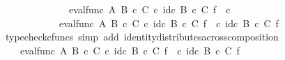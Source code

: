 \begin{isabellebody}
\ \ \ \ \isamarkupfalse%
\ {\isacharminus}{\kern0pt}\isanewline
\ \ \ \ \ \ \isamarkupfalse%
\ {\isachardoublequoteopen}eval{\isacharunderscore}{\kern0pt}func\ A\ {\isacharparenleft}{\kern0pt}B\ {\isasymtimes}\isactrlsub c\ C{\isacharparenright}{\kern0pt}\ {\isasymcirc}\isactrlsub c\ {\isacharparenleft}{\kern0pt}id\isactrlsub c\ {\isacharparenleft}{\kern0pt}B\ {\isasymtimes}\isactrlsub c\ C{\isacharparenright}{\kern0pt}\ {\isasymtimes}\isactrlsub f\ {\isacharparenleft}{\kern0pt}{\isasympsi}\isactrlsup {\isasymsharp}\ {\isasymcirc}\isactrlsub c\ {\isasymphi}\isactrlsup {\isasymsharp}\isactrlsup {\isasymsharp}{\isacharparenright}{\kern0pt}{\isacharparenright}{\kern0pt}\ {\isacharequal}{\kern0pt}\isanewline
\ \ \ \ \ \ \ \ \ \ \ \ eval{\isacharunderscore}{\kern0pt}func\ A\ {\isacharparenleft}{\kern0pt}B\ {\isasymtimes}\isactrlsub c\ C{\isacharparenright}{\kern0pt}\ {\isasymcirc}\isactrlsub c\ {\isacharparenleft}{\kern0pt}{\isacharparenleft}{\kern0pt}id\isactrlsub c\ {\isacharparenleft}{\kern0pt}B\ {\isasymtimes}\isactrlsub c\ C{\isacharparenright}{\kern0pt}\ {\isasymtimes}\isactrlsub f\ {\isacharparenleft}{\kern0pt}{\isasympsi}\isactrlsup {\isasymsharp}{\isacharparenright}{\kern0pt}{\isacharparenright}{\kern0pt}\ {\isasymcirc}\isactrlsub c\ {\isacharparenleft}{\kern0pt}id\isactrlsub c\ {\isacharparenleft}{\kern0pt}B\ {\isasymtimes}\isactrlsub c\ C{\isacharparenright}{\kern0pt}\ {\isasymtimes}\isactrlsub f\ {\isasymphi}\isactrlsup {\isasymsharp}\isactrlsup {\isasymsharp}{\isacharparenright}{\kern0pt}{\isacharparenright}{\kern0pt}{\isachardoublequoteclose}\isanewline
\ \ \ \ \ \ \ \ \isamarkupfalse%
\ {\isacharparenleft}{\kern0pt}typecheck{\isacharunderscore}{\kern0pt}cfuncs{\isacharcomma}{\kern0pt}\ simp\ add{\isacharcolon}{\kern0pt}\ identity{\isacharunderscore}{\kern0pt}distributes{\isacharunderscore}{\kern0pt}across{\isacharunderscore}{\kern0pt}composition{\isacharparenright}{\kern0pt}\isanewline
\ \ \ \ \ \ \isamarkupfalse%
\ \isamarkupfalse%
\ {\isachardoublequoteopen}{\isachardot}{\kern0pt}{\isachardot}{\kern0pt}{\isachardot}{\kern0pt}\ {\isacharequal}{\kern0pt}\ {\isacharparenleft}{\kern0pt}\ eval{\isacharunderscore}{\kern0pt}func\ A\ {\isacharparenleft}{\kern0pt}B\ {\isasymtimes}\isactrlsub c\ C{\isacharparenright}{\kern0pt}\ {\isasymcirc}\isactrlsub c\ {\isacharparenleft}{\kern0pt}id\isactrlsub c\ {\isacharparenleft}{\kern0pt}B\ {\isasymtimes}\isactrlsub c\ C{\isacharparenright}{\kern0pt}\ {\isasymtimes}\isactrlsub f\ {\isacharparenleft}{\kern0pt}{\isasympsi}\isactrlsup {\isasymsharp}{\isacharparenright}{\kern0pt}{\isacharparenright}{\kern0pt}{\isacharparenright}{\kern0pt}\ {\isasymcirc}\isactrlsub c\ {\isacharparenleft}{\kern0pt}id\isactrlsub c\ {\isacharparenleft}{\kern0pt}B\ {\isasymtimes}\isactrlsub c\ C{\isacharparenright}{\kern0pt}\ {\isasymtimes}\isactrlsub f\ {\isasymphi}\isactrlsup {\isasymsharp}\isactrlsup {\isasymsharp}{\isacharparenright}{\kern0pt}{\isachardoublequoteclose}\isanewline

\end{isabellebody}
